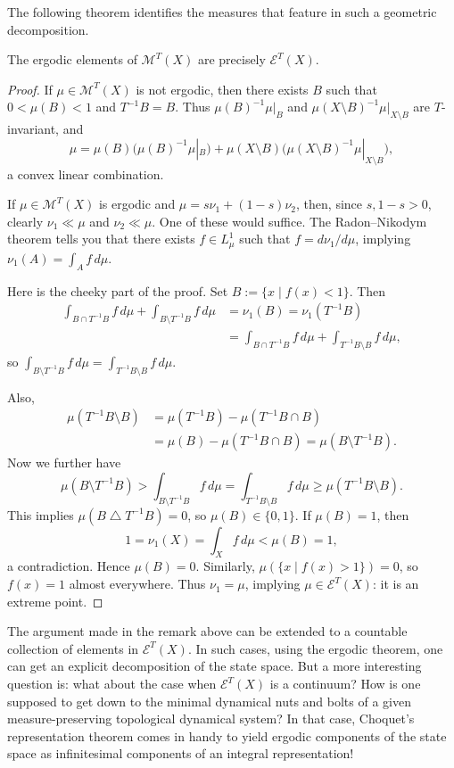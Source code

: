\documentclass[11pt,a4paper]{article}
\begin{document}
The following theorem identifies the measures that feature in such a
geometric decomposition.
\setcounter{theorem}{20}\begin{theorem}
The ergodic elements of $\mathcal M^T(X)$ are precisely $\mathcal E^T(X)$.
\end{theorem}
\begin{proof}
If $\mu\in\mathcal M^T(X)$ is not ergodic, then there exists $B$ such that $0<\mu(B)<1$ and $T^{-1}B=B$. Thus $\mu(B)^{-1}\mu|_B$ and $\mu(X\setminus B)^{-1}\mu|_{X\setminus B}$ are $T$-invariant, and
\[
 \mu=\mu(B)\bigl(\mu(B)^{-1}\mu|_B\bigr)
 +\mu(X\setminus B)\bigl(\mu(X\setminus B)^{-1}\mu|_{X\setminus B}\bigr),
\]
a convex linear combination.

If $\mu\in\mathcal M^T(X)$ is ergodic and
$\mu=s\nu_1+(1-s)\nu_2$, then, since $s,1-s>0$, clearly
$\nu_1\ll\mu$ and $\nu_2\ll\mu$. One of these would suffice. The
Radon--Nikodym theorem tells you that there exists $f\in L_\mu^1$ such that
$f=d\nu_1/d\mu$, implying $\nu_1(A)=\int_Af\,d\mu$.

Here is the cheeky part of the proof. Set $B:=\{x\mid f(x)<1\}$. Then
\[
\begin{aligned}
 \int_{B\cap T^{-1}B}f\,d\mu+\int_{B\setminus T^{-1}B}f\,d\mu
 &=\nu_1(B)=\nu_1(T^{-1}B)\\
 &=\int_{B\cap T^{-1}B}f\,d\mu+\int_{T^{-1}B\setminus B}f\,d\mu,
\end{aligned}
\]
so $\int_{B\setminus T^{-1}B}f\,d\mu=\int_{T^{-1}B\setminus B}f\,d\mu$.

Also,
\[
\begin{aligned}
 \mu(T^{-1}B\setminus B)
 &=\mu(T^{-1}B)-\mu(T^{-1}B\cap B)\\
 &=\mu(B)-\mu(T^{-1}B\cap B)=\mu(B\setminus T^{-1}B).
\end{aligned}
\]
Now we further have
\[
 \mu(B\setminus T^{-1}B)
 >\int_{B\setminus T^{-1}B}f\,d\mu
 =\int_{T^{-1}B\setminus B}f\,d\mu
 \geq\mu(T^{-1}B\setminus B).
\]
This implies $\mu(B\mathbin\triangle T^{-1}B)=0$, so $\mu(B)\in\{0,1\}$. If $\mu(B)=1$, then
\[
 1=\nu_1(X)=\int_Xf\,d\mu<\mu(B)=1,
\]
a contradiction. Hence $\mu(B)=0$. Similarly, $\mu(\{x\mid f(x)>1\})=0$, so $f(x)=1$ almost everywhere. Thus $\nu_1=\mu$, implying $\mu\in\mathcal E^T(X)$: it is an extreme point.
\end{proof}

The argument made in the remark above can be extended to a countable
collection of elements in $\mathcal E^T(X)$. In such cases, using the ergodic
theorem, one can get an explicit decomposition of the state space. But a more
interesting question is: what about the case when $\mathcal E^T(X)$ is a
continuum? How is one supposed to get down to the minimal dynamical nuts and
bolts of a given measure-preserving topological dynamical system? In that
case, Choquet's representation theorem
comes in handy to yield ergodic components of the state space as infinitesimal
components of an integral representation!
\end{document}
